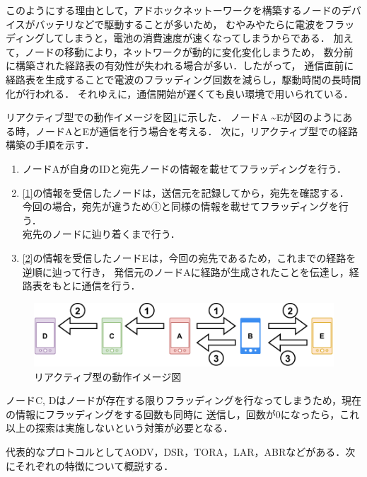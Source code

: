 \documentclass[a4paper, 11pt]{ltjsarticle}
\begin{document}
このようにする理由として，アドホックネットーワークを構築するノードのデバイスがバッテリなどで駆動することが多いため，
むやみやたらに電波をフラッディングしてしまうと，電池の消費速度が速くなってしまうからである．
加えて，ノードの移動により，ネットワークが動的に変化変化しまうため，
数分前に構築された経路表の有効性が失われる場合が多い．したがって，
通信直前に経路表を生成することで電波のフラッディング回数を減らし，駆動時間の長時間化が行われる．
それゆえに，通信開始が遅くても良い環境で用いられている．

リアクティブ型での動作イメージを図\ref{reactive}に示した．
ノードA \textasciitilde Eが図のようにある時，ノードAとEが通信を行う場合を考える．
次に，リアクティブ型での経路構築の手順を示す．

\begin{enumerate}[label=\ding{\numexpr171+\arabic*}]
  \item \label{1} ノードAが自身のIDと宛先ノードの情報を載せてフラッディングを行う．
  \item \label{2} \ref{1}の情報を受信したノードは，送信元を記録してから，宛先を確認する．
  今回の場合，宛先が違うため①と同様の情報を載せてフラッディングを行う．\\
  宛先のノードに辿り着くまで行う．
  \item \label{3} \ref{2}の情報を受信したノードEは，今回の宛先であるため，これまでの経路を逆順に辿って行き，
  発信元のノードAに経路が生成されたことを伝達し，経路表をもとに通信を行う．
\end{enumerate}

\begin{figure}[h]
  \centering
  \includegraphics[width=130mm]{reactive_model.pdf}
  \caption{リアクティブ型の動作イメージ図}
  \label{reactive}
\end{figure}

ノードC, Dはノードが存在する限りフラッディングを行なってしまうため，現在の情報にフラッディングをする回数も同時に
送信し，回数が0になったら，これ以上の探索は実施しないという対策が必要となる．

代表的なプロトコルとしてAODV，DSR，TORA，LAR，ABRなどがある．次にそれぞれの特徴について概説する．
\end{document}
